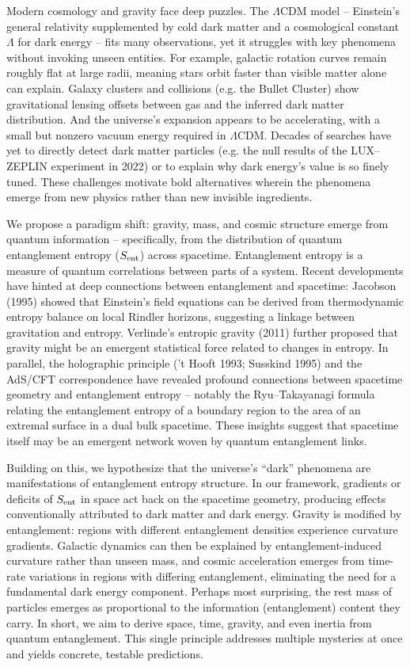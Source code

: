 \documentclass[11pt]{article}
\begin{document}
Modern cosmology and gravity face deep puzzles. The $\Lambda$CDM model – Einstein’s general relativity supplemented by cold dark matter and a cosmological constant $\Lambda$ for dark energy – fits many observations, yet it struggles with key phenomena without invoking unseen entities. For example, galactic rotation curves remain roughly flat at large radii, meaning stars orbit faster than visible matter alone can explain. Galaxy clusters and collisions (e.g. the Bullet Cluster) show gravitational lensing offsets between gas and the inferred dark matter distribution. And the universe’s expansion appears to be accelerating, with a small but nonzero vacuum energy required in $\Lambda$CDM. Decades of searches have yet to directly detect dark matter particles (e.g. the null results of the LUX–ZEPLIN experiment in 2022) or to explain why dark energy’s value is so finely tuned. These challenges motivate bold alternatives wherein the phenomena emerge from new physics rather than new invisible ingredients.

We propose a paradigm shift: gravity, mass, and cosmic structure emerge from quantum information – specifically, from the distribution of quantum entanglement entropy ($S_{\rm ent}$) across spacetime. Entanglement entropy is a measure of quantum correlations between parts of a system. Recent developments have hinted at deep connections between entanglement and spacetime: Jacobson (1995) showed that Einstein’s field equations can be derived from thermodynamic entropy balance on local Rindler horizons, suggesting a linkage between gravitation and entropy. Verlinde’s entropic gravity (2011) further proposed that gravity might be an emergent statistical force related to changes in entropy. In parallel, the holographic principle (’t Hooft 1993; Susskind 1995) and the AdS/CFT correspondence have revealed profound connections between spacetime geometry and entanglement entropy – notably the Ryu–Takayanagi formula relating the entanglement entropy of a boundary region to the area of an extremal surface in a dual bulk spacetime. These insights suggest that spacetime itself may be an emergent network woven by quantum entanglement links.

Building on this, we hypothesize that the universe’s “dark” phenomena are manifestations of entanglement entropy structure. In our framework, gradients or deficits of $S_{\rm ent}$ in space act back on the spacetime geometry, producing effects conventionally attributed to dark matter and dark energy. Gravity is modified by entanglement: regions with different entanglement densities experience curvature gradients. Galactic dynamics can then be explained by entanglement-induced curvature rather than unseen mass, and cosmic acceleration emerges from time-rate variations in regions with differing entanglement, eliminating the need for a fundamental dark energy component. Perhaps most surprising, the rest mass of particles emerges as proportional to the information (entanglement) content they carry. In short, we aim to derive space, time, gravity, and even inertia from quantum entanglement. This single principle addresses multiple mysteries at once and yields concrete, testable predictions.
\end{document}
